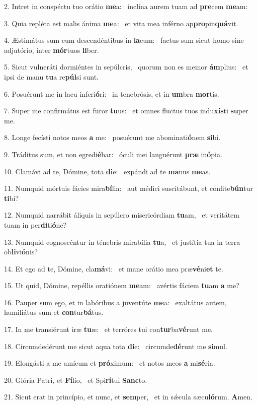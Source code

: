 2. Intret in conspéctu tuo orátio \textbf{me}a: \ast\  inclína aurem tuam ad \textbf{pre}cem \textbf{me}am:\

3. Quia repléta est malis ánima \textbf{me}a: \ast\  et vita mea inférno ap\textbf{pro}pin\textbf{quá}vit.\

4. Æstimátus sum cum descendéntibus in \textbf{la}cum: \ast\  factus sum sicut homo sine adjutório, inter \textbf{mór}tuos \textbf{li}ber.\

5. Sicut vulneráti dormiéntes in sepúlcris, \dag\  quorum non es memor \textbf{ám}plius: \ast\  et ipsi de manu \textbf{tu}a re\textbf{púl}si sunt.\

6. Posuérunt me in lacu inferi\textbf{ó}ri: \ast\  in tenebrósis, et in \textbf{um}bra \textbf{mor}tis.\

7. Super me confirmátus est furor \textbf{tu}us: \ast\  et omnes fluctus tuos indu\textbf{xís}ti \textbf{su}per me.\

8. Longe fecísti notos meos \textbf{a} me: \ast\  posuérunt me abominati\textbf{ó}nem \textbf{si}bi.\

9. Tráditus sum, et non egredi\textbf{é}bar: \ast\  óculi mei languérunt \textbf{præ} in\textbf{ó}pia.\

10. Clamávi ad te, Dómine, tota \textbf{di}e: \ast\  expándi ad te \textbf{ma}nus \textbf{me}as.\

11. Numquid mórtuis fácies mira\textbf{bí}lia: \ast\  aut médici suscitábunt, et confite\textbf{bún}tur \textbf{ti}bi?\

12. Numquid narrábit áliquis in sepúlcro misericórdiam \textbf{tu}am, \ast\  et veritátem tuam in per\textbf{di}ti\textbf{ó}ne?\

13. Numquid cognoscéntur in ténebris mirabília \textbf{tu}a, \ast\  et justítia tua in terra ob\textbf{li}vi\textbf{ó}nis?\

14. Et ego ad te, Dómine, cla\textbf{má}vi: \ast\  et mane orátio mea præ\textbf{vé}ni\textbf{et} te.\

15. Ut quid, Dómine, repéllis oratiónem \textbf{me}am: \ast\  avértis fáciem \textbf{tu}am \textbf{a} me?\

16. Pauper sum ego, et in labóribus a juventúte \textbf{me}a: \ast\  exaltátus autem, humiliátus sum et \textbf{con}tur\textbf{bá}tus.\

17. In me transiérunt iræ \textbf{tu}æ: \ast\  et terróres tui con\textbf{tur}ba\textbf{vé}runt me.\

18. Circumdedérunt me sicut aqua tota \textbf{di}e: \ast\  circumde\textbf{dé}runt me \textbf{si}mul.\

19. Elongásti a me amícum et \textbf{pró}ximum: \ast\  et notos meos \textbf{a} mi\textbf{sé}ria.\

20. Glória Patri, et \textbf{Fí}lio, \ast\  et Spi\textbf{rí}tui \textbf{Sanc}to.\

21. Sicut erat in princípio, et nunc, et \textbf{sem}per, \ast\  et in sǽcula sæcu\textbf{ló}rum. \textbf{A}men.\

